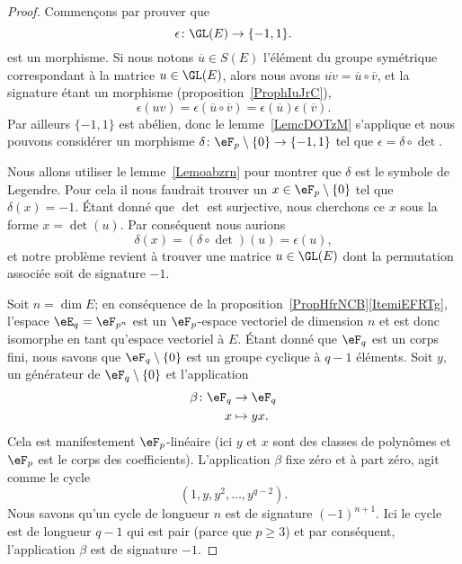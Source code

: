 \begin{proof}
	Commençons par prouver que
	\begin{equation}
		\epsilon\colon \GL(E)\to \{ -1,1 \}.
	\end{equation}
	est un morphisme. Si nous notons \( \overline u\in S(E)\) l'élément du groupe symétrique correspondant à la matrice \( u\in \GL(E)\), alors nous avons \( \overline{ uv }=\overline u\circ\overline v\), et la signature étant un morphisme (proposition~\ref{ProphIuJrC}),
	\begin{equation}
		\epsilon(uv)=\epsilon(\overline u\circ\overline v)=\epsilon(\overline u)\epsilon(\overline v).
	\end{equation}
	Par ailleurs \( \{ -1,1 \}\) est abélien, donc le lemme~\ref{LemcDOTzM} s'applique et nous pouvons considérer un morphisme \( \delta\colon \eF_p\setminus\{ 0 \}\to \{ -1,1 \}\) tel que \( \epsilon=\delta\circ\det\).

	Nous allons utiliser le lemme~\ref{Lemoabzrn} pour montrer que \( \delta\) est le symbole de Legendre. Pour cela il nous faudrait trouver un \( x\in \eF_p\setminus\{ 0 \}\) tel que \( \delta(x)=-1\). Étant donné que \( \det\) est surjective, nous cherchons ce \( x\) sous la forme \( x=\det(u)\). Par conséquent nous aurions
	\begin{equation}
		\delta(x)=(\delta\circ\det)(u)=\epsilon(u),
	\end{equation}
	et notre problème revient à trouver une matrice \( u\in\GL(E)\) dont la permutation associée soit de signature \( -1\).

	Soit \( n=\dim E\); en conséquence de la proposition~\ref{PropHfrNCB}\ref{ItemiEFRTg}, l'espace \( \eE_q=\eF_{p^n}\) est un \( \eF_p\)-espace vectoriel de dimension \( n\) et est donc isomorphe en tant qu'espace vectoriel à \( E\). Étant donné que \( \eF_q\) est un corps fini, nous savons que \( \eF_q\setminus\{ 0 \}\) est un groupe cyclique à \( q-1\) éléments. Soit \( y\), un générateur de \( \eF_q\setminus\{ 0 \}\) et l'application
	\begin{equation}
		\begin{aligned}
			\beta\colon \eF_q & \to \eF_q   \\
			x                 & \mapsto yx.
		\end{aligned}
	\end{equation}
	Cela est manifestement \( \eF_p\)-linéaire (ici \( y\) et \( x\) sont des classes de polynômes et \( \eF_p\) est le corps des coefficients). L'application \( \beta\) fixe zéro et à part zéro, agit comme le cycle
	\begin{equation}
		(1,y,y^2,\ldots, y^{q-2}).
	\end{equation}
	Nous savons qu'un cycle de longueur \( n\) est de signature \( (-1)^{n+1}\). Ici le cycle est de longueur \( q-1\) qui est pair (parce que \( p\geq 3\)) et par conséquent, l'application \( \beta\) est de signature \( -1\).
\end{proof}

